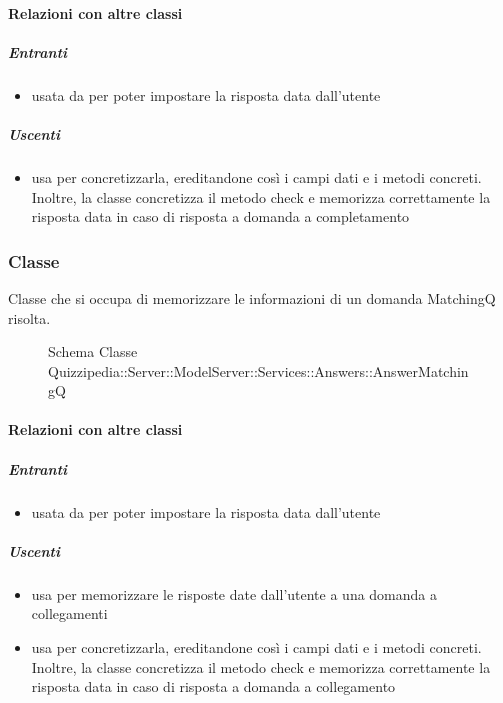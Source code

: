 \paragraph{Relazioni con altre classi}
\subparagraph{Entranti}
\begin{itemize}
\item usata da  per poter impostare la risposta data dall'utente
\end{itemize}
\subparagraph{Uscenti}
\begin{itemize}
\item usa  per concretizzarla, ereditandone così i campi dati e i metodi concreti. Inoltre, la classe concretizza il metodo check e memorizza correttamente la risposta data in caso di risposta a domanda a completamento
\end{itemize}
\subsubsection{Classe }
Classe che si occupa di memorizzare le informazioni di un domanda MatchingQ risolta.
\begin{figure}[H]
\centering
\noindent{}
\caption[Schema Classe AnswerMatchingQ]{Schema Classe Quizzipedia::Server::ModelServer::Services::Answers::AnswerMatchingQ}
\end{figure}
\paragraph{Relazioni con altre classi}
\subparagraph{Entranti}
\begin{itemize}
\item usata da  per poter impostare la risposta data dall'utente
\end{itemize}
\subparagraph{Uscenti}
\begin{itemize}
\item usa  per memorizzare le risposte date dall'utente a una domanda a collegamenti
\item usa  per concretizzarla, ereditandone così i campi dati e i metodi concreti. Inoltre, la classe concretizza il metodo check e memorizza correttamente la risposta data in caso di risposta a domanda a collegamento
\end{itemize}
